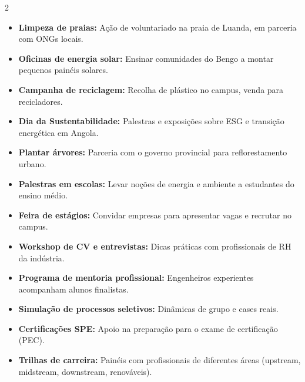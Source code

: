 \documentclass[11pt]{article}
\begin{document}
\begin{multicols}{2}
\begin{tcolorbox}[title={\large\color{spedark}🌱 Social e Ambiental}]
  \begin{itemize}
    \item \textbf{Limpeza de praias:} Ação de voluntariado na praia de Luanda, em parceria com ONGs locais.
    \item \textbf{Oficinas de energia solar:} Ensinar comunidades do Bengo a montar pequenos painéis solares.
    \item \textbf{Campanha de reciclagem:} Recolha de plástico no campus, venda para recicladores.
    \item \textbf{Dia da Sustentabilidade:} Palestras e exposições sobre ESG e transição energética em Angola.
    \item \textbf{Plantar árvores:} Parceria com o governo provincial para reflorestamento urbano.
    \item \textbf{Palestras em escolas:} Levar noções de energia e ambiente a estudantes do ensino médio.
  \end{itemize}
\end{tcolorbox}

\begin{tcolorbox}[title={\large\color{spedark}🚀 Desenvolvimento de Carreira}]
  \begin{itemize}
    \item \textbf{Feira de estágios:} Convidar empresas para apresentar vagas e recrutar no campus.
    \item \textbf{Workshop de CV e entrevistas:} Dicas práticas com profissionais de RH da indústria.
    \item \textbf{Programa de mentoria profissional:} Engenheiros experientes acompanham alunos finalistas.
    \item \textbf{Simulação de processos seletivos:} Dinâmicas de grupo e cases reais.
    \item \textbf{Certificações SPE:} Apoio na preparação para o exame de certificação (PEC).
    \item \textbf{Trilhas de carreira:} Painéis com profissionais de diferentes áreas (upstream, midstream, downstream, renováveis).
  \end{itemize}
\end{tcolorbox}


\end{multicols}
\end{document}
